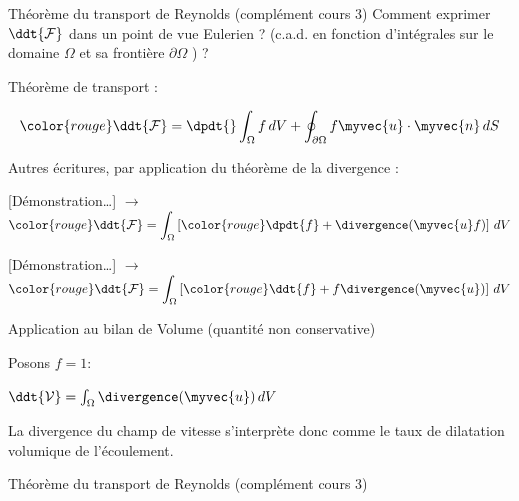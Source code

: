 {\begin{frame}{Théorème du transport de Reynolds (complément cours 3)}
Comment exprimer $\ddt{\mathcal{F}} $ dans un point de vue Eulerien ? 
(c.a.d. en fonction d'intégrales sur le domaine $\Omega$
et sa frontière $\partial \Omega$ ) ?


Théorème de transport :


\[
	\color{rouge}
	\ddt{\mathcal{F}} 
	= 
	\dpdt{} \int_\Omega f\, dV + \oint_{\partial\Omega} f\myvec{u}\cdot\myvec{n}\, dS
\]




\bigskip

Autres écritures, par application du \textcolor{vert}{théorème de la divergence} :

\medskip
\pause

[Démonstration\ldots] \qquad $\longrightarrow$ \qquad
$ \displaystyle \color{rouge}	
\ddt{\mathcal{F}} = 
\int_\Omega \left [{\color{rouge}\dpdt{f}} + \divergence (\myvec{u} f )\right ] \, dV
$


[Démonstration\ldots] \qquad $\longrightarrow$ \qquad
$ \displaystyle \color{rouge}	
\ddt{\mathcal{F}} = 
\int_\Omega \left [{\color{rouge}\ddt{f}} + f\divergence (\myvec{u})\right ] \, dV
$



\medskip
\pause 

Application au bilan de Volume (quantité non conservative) 

Posons $f= 1$:

\smallskip
$	
\ddt{\mathcal{V}} = 
\int_\Omega  \divergence (\myvec{u})  \, dV
$

\smallskip
La divergence du champ de vitesse s'interprète donc comme le taux de dilatation volumique de l'écoulement.


\end{frame}



\begin{frame}{Théorème du transport de Reynolds (complément cours 3)}


\end{frame}}
